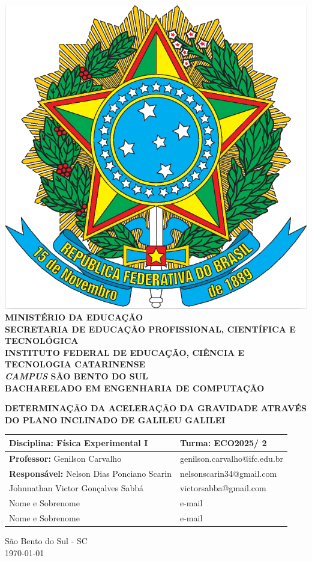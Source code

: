 \documentclass[a4paper, 12pt]{article}
\begin{document}

\begin{center}
	\includegraphics[scale=0.08]{./pictures/brasao.png}\\
	{\footnotesize {\bf MINISTÉRIO DA EDUCAÇÃO\\
		SECRETARIA DE EDUCAÇÃO PROFISSIONAL, CIENTÍFICA E TECNOLÓGICA\\
		INSTITUTO FEDERAL DE EDUCAÇÃO, CIÊNCIA E TECNOLOGIA
		CATARINENSE\\
		\textit{CAMPUS} SÃO BENTO DO SUL\\
		BACHARELADO EM ENGENHARIA DE COMPUTAÇÃO}}

	\vspace{5cm}
	\textbf{DETERMINAÇÃO DA ACELERAÇÃO DA GRAVIDADE ATRAVÉS DO PLANO INCLINADO DE GALILEU GALILEI}

	\vspace{3cm}
	\begin{tabular}{|l|l|}
		\hline
		{\bf Disciplina:} Física Experimental I        & {\bf Turma:} ECO2025/
		2                                                                             \\ \hline
		{\bf Professor:} Genilson Carvalho             & genilson.carvalho@ifc.edu.br \\ \hline
		{\bf Responsável:} Nelson Dias Ponciano Scarin & nelsonscarin34@gmail.com     \\ \hline
		Johnnathan Victor Gonçalves Sabbá              & victorsabba@gmail.com        \\ \hline
		Nome e Sobrenome                               & e-mail                       \\ \hline
		Nome e Sobrenome                               & e-mail                       \\ \hline
	\end{tabular}

	\vspace{7cm}
	São Bento do Sul - SC\\
	\today
\end{center}
\end{document}

